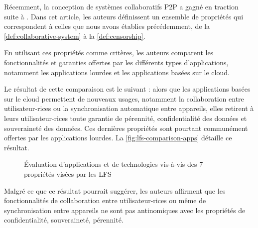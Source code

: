 Récemment, la conception de systèmes collaboratifs \ac{P2P} a gagné en traction suite à \cite{localfirstsoftware2019}.
Dans cet article, les auteurs définissent un ensemble de propriétés qui correspondent à celles que nous avons établies précédemment, de la \autoref{def:collaborative-system} à la \autoref{def:censorship}.

En utilisant ces propriétés comme critères, les auteurs comparent les fonctionnalités et garanties offertes par les différents types d'applications, notamment les applications lourdes et les applications basées sur le cloud.

Le résultat de cette comparaison est le suivant : alors que les applications basées sur le cloud permettent de nouveaux usages, notamment la collaboration entre utilisateur-rices ou la synchronisation automatique entre appareils, elles retirent à leurs utilisateur-rices toute garantie de pérennité, confidentialité des données et souveraineté des données.
Ces dernières propriétés sont pourtant communément offertes par les applications lourdes.
La \autoref{fig:lfs-comparison-apps} détaille ce résultat.

\begin{figure}[!ht]
  \centering
  \caption[Caption for lfs-comparison-apps]{Évaluation d'applications et de technologies vis-à-vis des 7 propriétés visées par les \acl{LFS}\footnotemark}
  \label{fig:lfs-comparison-apps}
\end{figure}

Malgré ce que ce résultat pourrait suggérer, les auteurs affirment que les fonctionnalités de collaboration entre utilisateur-rices ou même de synchronisation entre appareils ne sont pas antinomiques avec les propriétés de confidentialité, souveraineté, pérennité.

